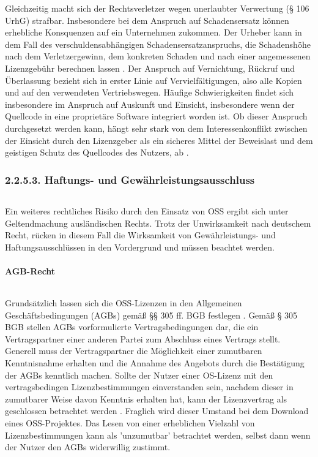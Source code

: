 Gleichzeitig macht sich der Rechtsverletzer wegen unerlaubter Verwertung (§ 106 UrhG) strafbar. Insbesondere bei dem Anspruch auf Schadensersatz können erhebliche Konsquenzen auf ein Unternehmen zukommen. Der Urheber kann in dem Fall des verschuldensabhängigen Schadensersatzanspruchs, die Schadenshöhe nach dem Verletzergewinn, dem konkreten Schaden und nach einer angemessenen Lizenzgebühr berechnen lassen \cite[S. 68]{bitkom_open_2016}. Der Anspruch auf Vernichtung, Rückruf und Überlassung bezieht sich in erster Linie auf Vervielfältigungen, also alle Kopien und auf den verwendeten Vertriebswegen. Häufige Schwierigkeiten findet sich insbesondere im Anspruch auf Auskunft und Einsicht, insbesondere wenn der Quellcode in eine proprietäre Software integriert worden ist. Ob dieser Anspruch durchgesetzt werden kann, hängt sehr stark von dem Interessenkonflikt zwischen der Einsicht durch den Lizenzgeber als ein sicheres Mittel der Beweislast und dem geistigen Schutz des Quellcodes des Nutzers, ab \cite[S. 68]{bitkom_open_2016}.

\subsubsection{2.2.5.3. Haftungs- und Gewährleistungsausschluss}$~$

Ein weiteres rechtliches Risiko durch den Einsatz von OSS ergibt sich unter Geltendmachung ausländischen Rechts. Trotz der Unwirksamkeit nach deutschem Recht, rücken in diesem Fall die Wirksamkeit von Gewährleistungs- und Haftungsausschlüssen in den Vordergrund und müssen beachtet werden. 

\paragraph{AGB-Recht}$~$

Grundsätzlich lassen sich die OSS-Lizenzen in den Allgemeinen Geschäftsbedingungen (AGBs) gemäß §§ 305 ff. BGB festlegen \cite{frohling-bleuer_urheber-_2007}. Gemäß § 305 BGB stellen AGBs vorformulierte Vertragsbedingungen dar, die ein Vertragspartner einer anderen Partei zum Abschluss eines Vertrags stellt. Generell muss der Vertragspartner die Möglichkeit einer zumutbaren Kenntnisnahme erhalten und die Annahme des Angebots durch die Bestätigung der AGBs kenntlich machen. Sollte der Nutzer einer OS-Lizenz mit den vertragsbedingen Lizenzbestimmungen einverstanden sein, nachdem dieser in zumutbarer Weise davon Kenntnis erhalten hat, kann der Lizenzvertrag als geschlossen betrachtet werden \cite[S. 23]{renner_open_2006}. Fraglich wird dieser Umstand bei dem Download eines OSS-Projektes. Das Lesen von einer erheblichen Vielzahl von Lizenzbestimmungen kann als 'unzumutbar' betrachtet werden, selbst dann wenn der Nutzer den AGBs widerwillig zustimmt.

